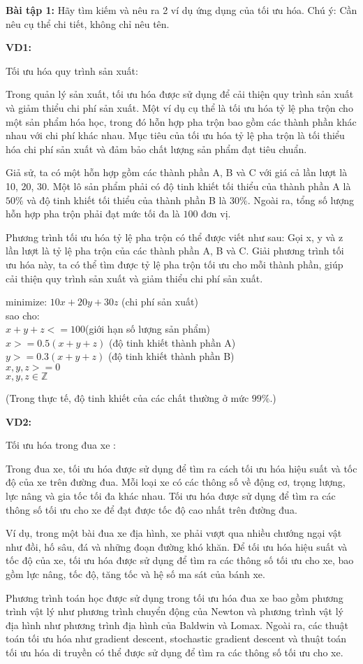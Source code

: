\textbf{Bài tập 1:}
Hãy tìm kiếm và nêu ra 2 ví dụ ứng dụng của tối ưu hóa.
Chú ý: Cần nêu cụ thể chi tiết, không chỉ nêu tên.

\textbf{VD1:} 

Tối ưu hóa quy trình sản xuất:

Trong quản lý sản xuất, tối ưu hóa được 
sử dụng để cải thiện quy trình sản xuất và giảm thiểu chi phí sản xuất.
 Một ví dụ cụ thể là tối ưu hóa tỷ lệ pha trộn cho một sản phẩm hóa học, 
 trong đó hỗn hợp pha trộn bao gồm các thành phần khác nhau với chi phí 
 khác nhau. Mục tiêu của tối ưu hóa tỷ lệ pha trộn là tối thiểu hóa chi
phí sản xuất và đảm bảo chất lượng sản phẩm đạt tiêu chuẩn.

Giả sử, ta có một hỗn hợp gồm các thành phần A, B và C với giá
 cả lần lượt là 10, 20, 30. 
 Một lô sản phẩm phải có độ tinh khiết tối thiểu của thành phần A là $50\%$
  và độ tinh khiết tối thiểu của thành phần B là $30\%$.
 Ngoài ra, tổng số lượng hỗn hợp pha trộn phải đạt mức tối 
 đa là $100$ đơn vị.


Phương trình tối ưu hóa tỷ lệ pha trộn có thể được viết như sau:
Gọi x, y và z lần lượt là tỷ lệ pha trộn của các thành phần A, B và C.
 Giải phương trình tối ưu hóa này, ta có thể tìm được
  tỷ lệ pha trộn tối ưu cho mỗi thành phần, giúp cải thiện quy trình sản xuất và giảm thiểu chi phí sản xuất.

minimize: $10x + 20y + 30z$ (chi phí sản xuất)\\
sao cho:\\
$x + y + z <= 100 $(giới hạn số lượng sản phẩm)\\
$x >= 0.5(x+y+z)$ (độ tinh khiết thành phần A)\\
$y >= 0.3(x+y+z)$ (độ tinh khiết thành phần B)\\
$x,y,z >= 0 $\\
$x,y,z \in \mathbb{Z}$

(Trong thực tế, độ tinh khiết của các chất thường ở mức $99\%$.)

\textbf{VD2:} 

Tối ưu hóa trong đua xe :

Trong đua xe, tối ưu hóa được sử dụng để tìm ra cách tối ưu hóa hiệu suất và tốc độ của xe trên đường đua. Mỗi loại xe có các thông số về động cơ, trọng lượng, lực nâng và gia tốc tối đa khác nhau. Tối ưu hóa được sử dụng để tìm ra các thông số tối ưu cho xe để đạt được tốc độ cao nhất trên đường đua.

Ví dụ, trong một bài đua xe địa hình, xe phải vượt qua nhiều chướng ngại vật như đồi, hố sâu, đá và những đoạn đường khó khăn. Để tối ưu hóa hiệu suất và tốc độ của xe, tối ưu hóa được sử dụng để tìm ra các thông số tối ưu cho xe, bao gồm lực nâng, tốc độ, tăng tốc và hệ số ma sát của bánh xe.

Phương trình toán học được sử dụng trong tối ưu hóa đua xe bao gồm phương trình vật lý như phương trình chuyển động của Newton và phương trình vật lý địa hình như phương trình địa hình của Baldwin và Lomax. Ngoài ra, các thuật toán tối ưu hóa như gradient descent, stochastic gradient descent và thuật toán tối ưu hóa di truyền
 có thể được sử dụng để tìm ra các thông số tối ưu cho xe.
